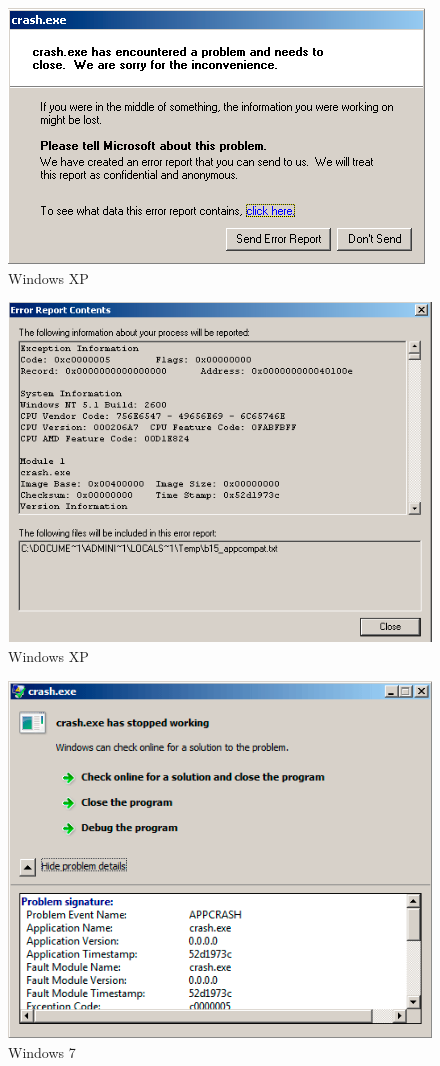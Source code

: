 \begin{figure}[H]
\centering
\includegraphics[scale=\NormalScale]{OS/SEH/1/crash_xp1.png}
\caption{Windows XP}
\end{figure}

\begin{figure}[H]
\centering
\includegraphics[scale=\NormalScale]{OS/SEH/1/crash_xp2.png}
\caption{Windows XP}
\end{figure}

\begin{figure}[H]
\centering
\includegraphics[scale=\NormalScale]{OS/SEH/1/crash_win7.png}
\caption{Windows 7}
\end{figure}

